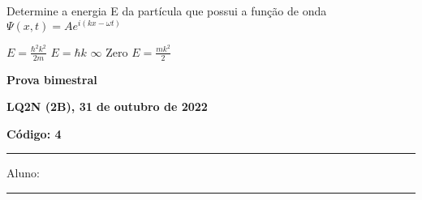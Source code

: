 \documentclass[12pt, addpoints]{exam}
\begin{document}
        \begin{questions}
\begin{multicols*}{2}
\question[20] Determine a energia E da partícula que possui a função de onda $\Psi(x,t)=Ae^{i(kx-\omega t)}$

\begin{choices}
\choice $E=\frac{\hbar^2k^2}{2m}$ \choice $E=\hbar k$ \choice $\infty$ \choice Zero \choice $E = \frac{mk^2}{2}$ \end{choices}
\end{multicols*}
\end{questions}
\newpage
        \begin{minipage}[b]{0.75\linewidth}
            \begin{flushleft}
                {\bf \large Prova bimestral}
            \end{flushleft}
            \begin{flushleft}
                {\bf \large LQ2N (2B), 31 de outubro de 2022}
            \end{flushleft}
        \end{minipage}
        \begin{minipage}[b]{0.20\linewidth}
            \begin{flushright}
                {\bf \large Código: 4}
            \end{flushright}
        \end{minipage}
        \vspace{0.5cm} \hrule \vspace{0.5cm}
        \begin{minipage}{0.75\linewidth}
            Aluno:
        \end{minipage}
        \vspace{0.5cm} \hrule \vspace{0.5cm}
\end{document}
